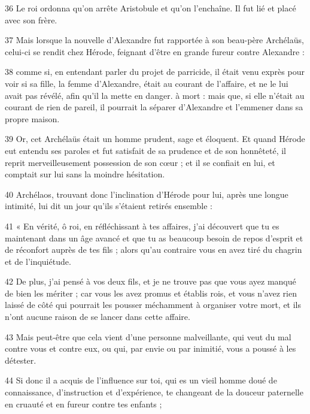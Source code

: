 \par 36 Le roi ordonna qu'on arrête Aristobule et qu'on l'enchaîne. Il fut lié et placé avec son frère.

\par 37 Mais lorsque la nouvelle d'Alexandre fut rapportée à son beau-père Archélaüs, celui-ci se rendit chez Hérode, feignant d'être en grande fureur contre Alexandre :


\par 38 comme si, en entendant parler du projet de parricide, il était venu exprès pour voir si sa fille, la femme d'Alexandre, était au courant de l'affaire, et ne le lui avait pas révélé, afin qu'il la mette en danger. à mort : mais que, si elle n'était au courant de rien de pareil, il pourrait la séparer d'Alexandre et l'emmener dans sa propre maison.

\par 39 Or, cet Archélaüs était un homme prudent, sage et éloquent. Et quand Hérode eut entendu ses paroles et fut satisfait de sa prudence et de son honnêteté, il reprit merveilleusement possession de son cœur ; et il se confiait en lui, et comptait sur lui sans la moindre hésitation.

\par 40 Archélaos, trouvant donc l'inclination d'Hérode pour lui, après une longue intimité, lui dit un jour qu'ils s'étaient retirés ensemble :

\par 41 « En vérité, ô roi, en réfléchissant à tes affaires, j'ai découvert que tu es maintenant dans un âge avancé et que tu as beaucoup besoin de repos d'esprit et de réconfort auprès de tes fils ; alors qu'au contraire vous en avez tiré du chagrin et de l'inquiétude.

\par 42 De plus, j'ai pensé à vos deux fils, et je ne trouve pas que vous ayez manqué de bien les mériter ; car vous les avez promus et établis rois, et vous n'avez rien laissé de côté qui pourrait les pousser méchamment à organiser votre mort, et ils n'ont aucune raison de se lancer dans cette affaire.

\par 43 Mais peut-être que cela vient d'une personne malveillante, qui veut du mal contre vous et contre eux, ou qui, par envie ou par inimitié, vous a poussé à les détester.

\par 44 Si donc il a acquis de l'influence sur toi, qui es un vieil homme doué de connaissance, d'instruction et d'expérience, te changeant de la douceur paternelle en cruauté et en fureur contre tes enfants ;

